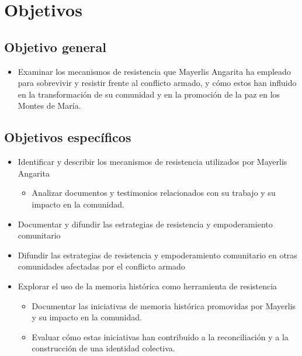 \documentclass[letterpaper, 12pt]{report}
\begin{document}
\section*{Objetivos}

\subsection*{Objetivo general}

\begin{itemize}
      \item Examinar los mecanismos de resistencia que Mayerlis Angarita ha empleado para
            sobrevivir y resistir frente al conflicto armado, y cómo estos han influido en
            la transformación de su comunidad y en la promoción de la paz en los Montes de
            María.
\end{itemize}

\subsection*{Objetivos específicos}

\begin{itemize}
      \item Identificar y describir los mecanismos de resistencia utilizados por Mayerlis
            Angarita
            \begin{itemize}
                  \item Analizar documentos y testimonios relacionados con su trabajo y su impacto en
                        la comunidad.
            \end{itemize}

      \item Documentar y difundir las estrategias de resistencia y empoderamiento
            comunitario

      \item Difundir las estrategias de resistencia y empoderamiento comunitario en otras
            comunidades afectadas por el conflicto armado

      \item Explorar el uso de la memoria histórica como herramienta de resistencia
            \begin{itemize}
                  \item Documentar las iniciativas de memoria histórica promovidas por Mayerlis y su
                        impacto en la comunidad.
                  \item Evaluar cómo estas iniciativas han contribuido a la reconciliación y a la
                        construcción de una identidad colectiva.
            \end{itemize}
\end{itemize}

\end{document}
